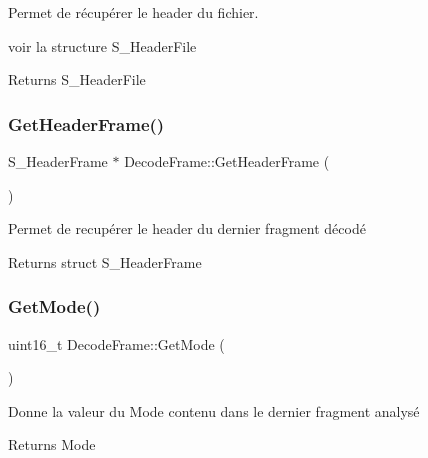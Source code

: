 Permet de récupérer le header du fichier. 

voir la structure S\+\_\+\+Header\+File \begin{DoxyReturn}{Returns}
S\+\_\+\+Header\+File 
\end{DoxyReturn}
\mbox{\label{classDecodeFrame_a0c3e4dd83dc4b935589628a17b0de765}} 
\subsubsection{\texorpdfstring{Get\+Header\+Frame()}{GetHeaderFrame()}}
{\footnotesize\ttfamily S\+\_\+\+Header\+Frame $\ast$ Decode\+Frame\+::\+Get\+Header\+Frame (\begin{DoxyParamCaption}{ }\end{DoxyParamCaption})}



Permet de recupérer le header du dernier fragment décodé 

\begin{DoxyReturn}{Returns}
struct S\+\_\+\+Header\+Frame 
\end{DoxyReturn}
\mbox{\label{classDecodeFrame_a0bb520a314a74665a0092dbbf0f32310}} 
\subsubsection{\texorpdfstring{Get\+Mode()}{GetMode()}}
{\footnotesize\ttfamily uint16\+\_\+t Decode\+Frame\+::\+Get\+Mode (\begin{DoxyParamCaption}{ }\end{DoxyParamCaption})\hspace{0.3cm}{\ttfamily [inline]}}



Donne la valeur du Mode contenu dans le dernier fragment analysé 

\begin{DoxyReturn}{Returns}
Mode 
\end{DoxyReturn}
\mbox{\label{classDecodeFrame_a443f66af9144baf11fa5d5cd9c358729}} 
